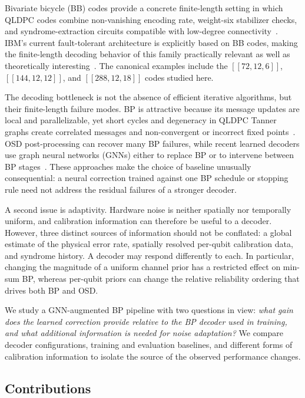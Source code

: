 \documentclass[a4paper,twocolumn,11pt,nopdfoutputerror]{quantumarticle}
\newcommand{\code}[3]{\ensuremath{[\![#1,#2,#3]\!]}}
\begin{document}
Bivariate bicycle (BB) codes provide a concrete finite-length setting in
which QLDPC codes combine non-vanishing encoding rate, weight-six
stabilizer checks, and syndrome-extraction circuits compatible with
low-degree connectivity~\cite{Bravyi2024Memory}. IBM's current
fault-tolerant architecture is explicitly based on BB codes, making the
finite-length decoding behavior of this family practically relevant as
well as theoretically interesting~\cite{IBMRoadmap2025}. The canonical
examples include the $\code{72}{12}{6}$, $\code{144}{12}{12}$, and
$\code{288}{12}{18}$ codes studied here.

The decoding bottleneck is not the absence of efficient iterative
algorithms, but their finite-length failure modes. BP is attractive
because its message updates are local and parallelizable, yet short
cycles and degeneracy in QLDPC Tanner graphs create correlated messages
and non-convergent or incorrect fixed points~\cite{Roffe2020Landscape}.
OSD post-processing can recover many BP failures, while recent learned
decoders use graph neural networks (GNNs) either to replace BP or to
intervene between BP stages~\cite{Gong2024GNN,Maan2025MLBP}. These
approaches make the choice of baseline unusually consequential: a neural
correction trained against one BP schedule or stopping rule need not
address the residual failures of a stronger decoder.

A second issue is adaptivity. Hardware noise is neither spatially nor
temporally uniform, and calibration information can therefore be useful
to a decoder. However, three distinct sources of information should not
be conflated: a global estimate of the physical error rate, spatially
resolved per-qubit calibration data, and syndrome history. A decoder may
respond differently to each. In particular, changing the magnitude of a
uniform channel prior has a restricted effect on min-sum BP, whereas
per-qubit priors can change the relative reliability ordering that drives
both BP and OSD.

We study a GNN-augmented BP pipeline with two questions in view:
\emph{what gain does the learned correction provide relative to the BP
decoder used in training, and what additional information is needed for
noise adaptation?} We compare decoder configurations, training and
evaluation baselines, and different forms of calibration information to
isolate the source of the observed performance changes.

\subsection{Contributions}\label{sec:contributions}
\end{document}
